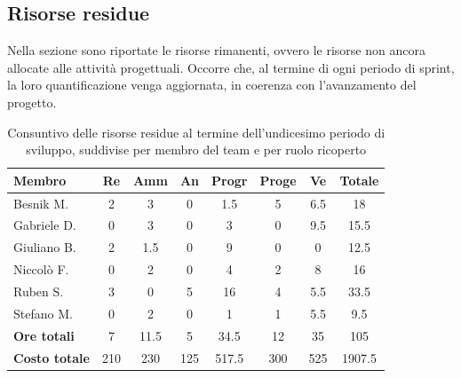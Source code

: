\documentclass[a4paper,10pt]{article}
\begin{document}
\subsection{Risorse residue}
Nella sezione sono riportate le risorse rimanenti, ovvero le risorse non ancora allocate alle attività progettuali. Occorre che, al termine di ogni periodo di sprint, la loro quantificazione venga aggiornata, in coerenza con l'avanzamento del progetto.

\begin{table}[H]
  \centering
  \begin{tabular}{|l|c|c|c|c|c|c|c|}
    \hline
    \textbf{Membro} & \textbf{Re} & \textbf{Amm} & \textbf{An} & \textbf{Progr} & \textbf{Proge} & \textbf{Ve} & \textbf{Totale} \\
    \hline
    Besnik M.   & 2   & 3   & 0 & 1.5   & 5 & 6.5 & 18 \\
    Gabriele D. & 0   & 3   & 0 & 3   & 0   & 9.5 & 15.5 \\
    Giuliano B. & 2   & 1.5 & 0   & 9   & 0   & 0 & 12.5   \\
    Niccolò F.  & 0   & 2   & 0   & 4   & 2   & 8   & 16   \\
    Ruben S.    & 3   & 0   & 5  & 16   & 4 & 5.5   & 33.5 \\
    Stefano M.  & 0   & 2   & 0   & 1   & 1   & 5.5 & 9.5   \\
    \hline
    \textbf{Ore totali}   & 7  & 11.5 & 5   & 34.5   & 12    & 35 & 105 \\
    \hline
    \textbf{Costo totale} & 210  & 230  & 125  & 517.5  & 300  & 525 & 1907.5 \\
    \hline
  \end{tabular}
  \caption{Consuntivo delle risorse residue al termine dell'undicesimo periodo di sviluppo, suddivise per membro del team e per ruolo ricoperto}
\end{table}
\end{document}
